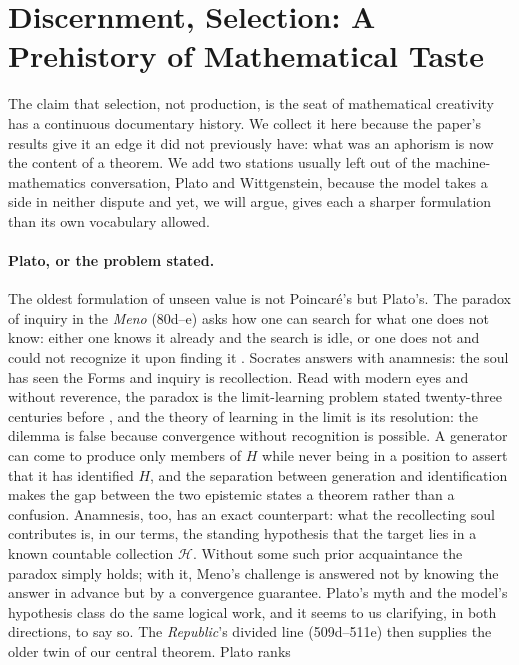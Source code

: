 \documentclass[11pt]{article}
\numberwithin{equation}{section}
\newcommand{\mc}[1]{\mathcal{#1}}
\newcommand{\Val}{H}
\newcommand{\Hcal}{\mc{H}}
\theoremstyle{plain}
\theoremstyle{definition}
\theoremstyle{remark}
\begin{document}
\section{Discernment, Selection: A Prehistory of Mathematical Taste}
\label{app:history}

The claim that selection, not production, is the seat of mathematical creativity has a
continuous documentary history. We collect it here because the paper's results give it an
edge it did not previously have: what was an aphorism is now the content of a theorem. We
add two stations usually left out of the machine-mathematics conversation, Plato and
Wittgenstein, because the model takes a side in neither dispute and yet, we will argue,
gives each a sharper formulation than its own vocabulary allowed.

\paragraph{Plato, or the problem stated.}
The oldest formulation of unseen value is not Poincar\'e's but Plato's. The paradox of
inquiry in the \emph{Meno} (80d--e) asks how one can search for what one does not know:
either one knows it already and the search is idle, or one does not and could not recognize
it upon finding it \citep{plato_meno}. Socrates answers with anamnesis: the soul has seen
the Forms and inquiry is recollection. Read with modern eyes and without reverence, the
paradox is the limit-learning problem stated twenty-three centuries before
\citet{gold1967language}, and the theory of learning in the limit is its resolution: the
dilemma is false because convergence without recognition is possible. A generator can come
to produce only members of $\Val$ while never being in a position to assert that it has
identified $\Val$, and the separation between generation and identification
\citep{kleinberg2024language} makes the gap between the two epistemic states a theorem
rather than a confusion. Anamnesis, too, has an exact counterpart: what the recollecting
soul contributes is, in our terms, the standing hypothesis that the target lies in a known
countable collection $\Hcal$. Without some such prior acquaintance the paradox simply
holds; with it, Meno's challenge is answered not by knowing the answer in advance but by a
convergence guarantee. Plato's myth and the model's hypothesis class do the same logical
work, and it seems to us clarifying, in both directions, to say so. The \emph{Republic}'s
divided line (509d--511e) then supplies the older twin of our central theorem. Plato ranks
\end{document}
